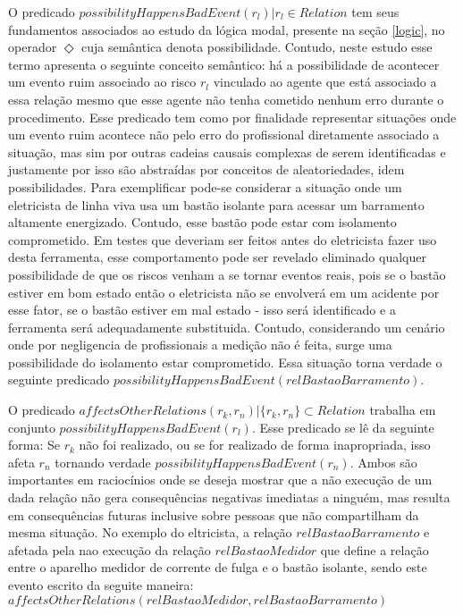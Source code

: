O predicado $possibilityHappensBadEvent(r_l) | r_l \in Relation $ tem seus fundamentos associados ao estudo da lógica modal, presente na seção \ref{logic}, no operador 
$\Diamond$ cuja semântica denota possibilidade. Contudo, neste estudo esse termo apresenta o seguinte conceito semântico: há a possibilidade 
de acontecer um evento ruim associado ao risco $r_l$ vinculado ao agente que está associado a essa relação mesmo que esse agente 
não tenha cometido nenhum erro durante o procedimento. Esse predicado tem como por finalidade representar situações onde um evento 
ruim acontece não pelo erro do profissional diretamente associado a situação, mas sim por outras cadeias causais complexas de serem identificadas e justamente por isso 
são abstraídas por conceitos de aleatoriedades, idem possibilidades. Para 
exemplificar pode-se considerar a situação onde um eletricista de linha viva usa um bastão isolante para acessar um barramento altamente energizado.
Contudo, esse bastão pode estar com isolamento comprometido. Em testes que deveriam ser feitos antes do eletricista fazer uso desta ferramenta,
esse comportamento pode ser revelado eliminado qualquer possibilidade de que os riscos venham a se tornar eventos reais, pois se o bastão estiver em bom estado
então o eletricista não se envolverá em um acidente por esse fator, se o bastão estiver em mal estado - isso será identificado e a ferramenta 
será adequadamente substituida. Contudo, considerando um cenário onde por negligencia de profissionais a medição não é feita, surge 
uma possibilidade do isolamento estar comprometido. Essa situação torna verdade o seguinte predicado $possibilityHappensBadEvent(relBastaoBarramento)$.

O predicado $affectsOtherRelations(r_k,r_n) | \{ r_k, r_n\} \subset Relation $ trabalha em conjunto $possibilityHappensBadEvent(r_l)$. Esse predicado se 
lê da seguinte forma: Se $r_k$ não foi realizado, ou se for realizado de forma inapropriada, isso afeta  $r_n$ tornando verdade 
$possibilityHappensBadEvent(r_n)$. Ambos são importantes em raciocínios onde se deseja mostrar que a não execução de um dada relação 
não gera consequências negativas imediatas a ninguém, mas resulta em consequências futuras inclusive sobre pessoas que não compartilham 
da mesma situação. No exemplo do eltricista, a relação $relBastaoBarramento$ e afetada pela nao execução da relação $relBastaoMedidor$ 
que define a relação entre o aparelho medidor de corrente de fulga e o bastão isolante, sendo este evento escrito da seguite maneira:
$affectsOtherRelations(relBastaoMedidor,relBastaoBarramento)$

